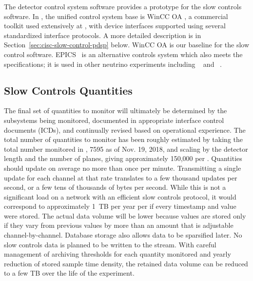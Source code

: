 The  detector control system software \cite{pdspdcs_proc} provides a prototype for %
the  slow controls software.
In , the unified control system base is WinCC OA \cite{winccoa}, a
commercial toolkit used extensively at , with device interfaces
supported using several standardized interface protocols. A more detailed description is in Section~\ref{sec:cisc-slow-control-pdsp} below.
WinCC OA is our baseline for the  slow control software.
EPICS~\cite{epics7} is an alternative controls system which also meets the specifications; it is used in other neutrino experiments including ~\cite{microboone} and ~\cite{Lukhanin:2012fp}. 


\subsection{Slow Controls Quantities}
\label{sec:fdgen-slow-cryo-quant}


The final set of quantities to monitor will ultimately be determined
by the subsystems being monitored, documented in
appropriate  interface control documents (ICDs), and continually revised based on operational
experience.  The total number of quantities to monitor has been roughly estimated by taking the total number monitored
in \cite{pdspdcs_proc}, 7595 as of Nov. 19, 2018, and scaling by the detector length and the number of planes, giving approximately 150,000 per .
Quantities should update on average no more than once per minute.
Transmitting a single update for each channel at that rate translates to a few thousand updates per second, or a few tens of thousands of bytes per second. While this is not a significant load on a network with an efficient slow controls protocol, it would correspond to approximately 1~TB per year per  if every timestamp and value were stored.
The actual data volume will be lower %
because values are stored only if they vary from previous values by more than an amount that is adjustable channel-by-channel.
Database storage also allows data to be sparsified later.
No slow controls data is planned to be written to the  stream.
With careful management of archiving thresholds for each quantity monitored and yearly reduction of stored sample time density, the retained data volume can be reduced to a few TB over the life of the experiment.

